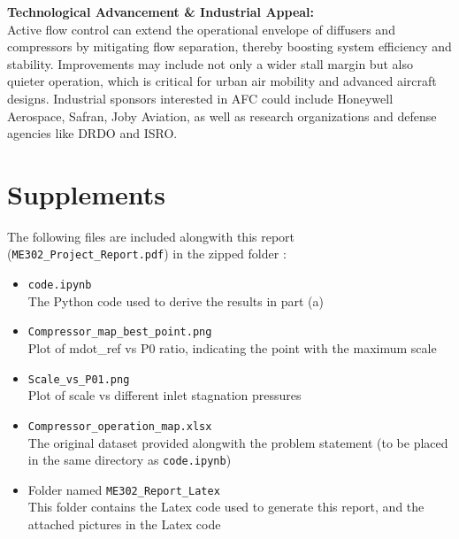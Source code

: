 \documentclass[12pt,a4paper]{article}
\begin{document}
\vspace{0.5em}
\textbf{Technological Advancement \& Industrial Appeal:}\\[0.5em]
Active flow control can extend the operational envelope of diffusers and compressors by mitigating flow separation, thereby boosting system efficiency and stability. Improvements may include not only a wider stall margin but also quieter operation, which is critical for urban air mobility and advanced aircraft designs. Industrial sponsors interested in AFC could include Honeywell Aerospace, Safran, Joby Aviation, as well as research organizations and defense agencies like DRDO and ISRO.

\vspace{0.5em}
\section*{Supplements}
The following files are included alongwith this report (\texttt{ME302\_Project\_Report.pdf}) in the zipped folder :
\begin{itemize}
    \item \texttt{code.ipynb}\\
    The Python code used to derive the results in part (a)
    \item \texttt{Compressor\_map\_best\_point.png}\\
    Plot of mdot\_ref vs P0 ratio, indicating the point with the maximum scale
    \item \texttt{Scale\_vs\_P01.png}\\
    Plot of scale vs different inlet stagnation pressures
    \item \texttt{Compressor\_operation\_map.xlsx}\\
    The original dataset provided alongwith the problem statement (to be placed in the same directory as \texttt{code.ipynb})
    \item Folder named \texttt{ME302\_Report\_Latex}\\
    This folder contains the Latex code used to generate this report, and the attached pictures in the Latex code

\end{itemize}
\end{document}

